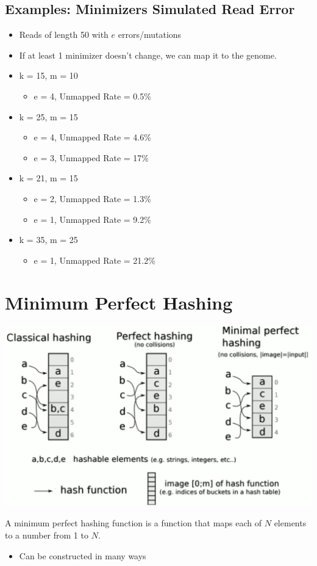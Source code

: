 \documentclass[10pt]{article}
\begin{document}
\subsection*{Examples: Minimizers Simulated Read Error}
\begin{itemize}
    \item Reads of length 50 with $e$ errors/mutations
    \item If at least 1 minimizer doesn't change, we can map it to the genome.
    \item k = 15, m = 10
    \begin{itemize}
        \item e = 4, Unmapped Rate = 0.5\%
    \end{itemize}
    \item k = 25, m = 15
    \begin{itemize}
        \item e = 4, Unmapped Rate = 4.6\%
        \item e = 3, Unmapped Rate = 17\%
    \end{itemize}
    \item k = 21, m = 15
    \begin{itemize}
        \item e = 2, Unmapped Rate = 1.3\%
        \item e = 1, Unmapped Rate = 9.2\%
    \end{itemize}
    \item k = 35, m = 25
    \begin{itemize}
        \item e = 1, Unmapped Rate = 21.2\%
    \end{itemize}
\end{itemize}

\section*{Minimum Perfect Hashing}
\begin{center}
    \includegraphics*[width=\textwidth]{W2_6.png}
\end{center}
A minimum perfect hashing function is a function that maps each of $N$ elements to a number from 1 to $N$.
\begin{itemize}
    \item Can be constructed in many ways
\end{itemize}
\end{document}
